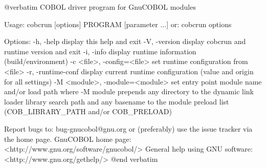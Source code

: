 @verbatim
COBOL driver program for GnuCOBOL modules

Usage: cobcrun [options] PROGRAM [parameter ...]
  or:  cobcrun options

Options:
  -h, -help                      display this help and exit
  -V, -version                   display cobcrun and runtime version and exit
  -i, -info                      display runtime information (build/environment)
  -c <file>, -config=<file>      set runtime configuration from <file>
  -r, -runtime-conf              display current runtime configuration
                                 (value and origin for all settings)
  -M <module>, -module=<module>  set entry point module name and/or load path
                                 where -M module prepends any directory to the
                                 dynamic link loader library search path
                                 and any basename to the module preload list
                                 (COB_LIBRARY_PATH and/or COB_PRELOAD)

Report bugs to: bug-gnucobol@gnu.org
or (preferably) use the issue tracker via the home page.
GnuCOBOL home page: <http://www.gnu.org/software/gnucobol/>
General help using GNU software: <http://www.gnu.org/gethelp/>
@end verbatim
